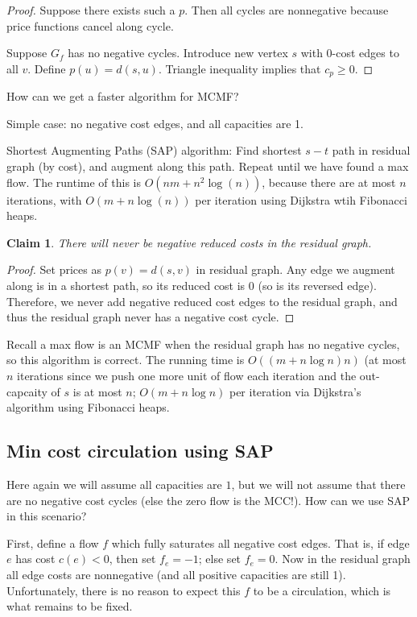 \documentclass[11pt]{article}
\newtheorem{claim}[theorem]{Claim}
\begin{document}
\begin{proof}
    Suppose there exists such a $p$. Then all cycles are nonnegative because price functions cancel along cycle.

    Suppose $G_f$ has no negative cycles. Introduce new vertex $s$ with 0-cost edges to all $v$. Define $p(u) = d(s,u)$. Triangle inequality implies that $c_p\geq 0$.
\end{proof}

How can we get a faster algorithm for MCMF?

Simple case: no negative cost edges, and all capacities are 1.

Shortest Augmenting Paths (SAP) algorithm: Find shortest $s-t$ path in residual graph (by cost), and augment along this path. Repeat until we have found a max flow.
The runtime of this is $O(nm + n^2\log(n))$, because there are at most $n$ iterations, with $O(m+n\log(n))$ per iteration using Dijkstra wtih Fibonacci heaps.

\begin{claim}
    There will never be negative reduced costs in the residual graph.
\end{claim}

\begin{proof}
    Set prices as $p(v) = d(s,v)$ in residual graph. Any edge we augment along is in a shortest path, so its reduced cost is 0 (so is its reversed edge). Therefore, we never add negative reduced cost edges to the residual graph, and thus the residual graph never has a negative cost cycle.
\end{proof}

Recall a max flow is an MCMF when the residual graph has no negative cycles, so this algorithm is correct. The running time is $O((m+ n\log n)n)$ (at most $n$ iterations since we push one more unit of flow each iteration and the out-capcaity of $s$ is at most $n$; $O(m + n\log n)$ per iteration via Dijkstra's algorithm using Fibonacci heaps.

\subsection{Min cost circulation using SAP}
Here again we will assume all capacities are $1$, but we will not assume that there are no negative cost cycles (else the zero flow is the MCC!). How can we use SAP in this scenario?

First, define a flow $f$ which fully saturates all negative cost edges. That is, if edge $e$ has cost $c(e) < 0$, then set $f_e = -1$; else set $f_e = 0$. Now in the residual graph all edge costs are nonnegative (and all positive capacities are still 1). Unfortunately, there is no reason to expect this $f$ to be a circulation, which is what remains to be fixed.
\end{document}
